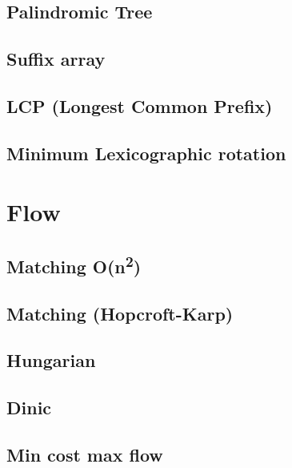 \begin{multicols}{2}
\subsection{Palindromic Tree}

\subsection{Suffix array}

\subsection{LCP (Longest Common Prefix)}

\subsection{Minimum Lexicographic rotation}

\section{Flow}

\subsection{Matching O(n\textsuperscript{2})}

\subsection{Matching (Hopcroft-Karp)}

\subsection{Hungarian}

\subsection{Dinic}

\subsection{Min cost max flow}


\end{multicols}
